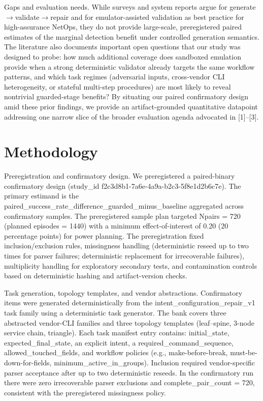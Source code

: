 \documentclass[conference]{IEEEtran}
\begin{document}
Gaps and evaluation needs. While surveys and system reports argue for generate\ensuremath{\rightarrow}validate\ensuremath{\rightarrow}repair and for emulator-assisted validation as best practice for high-assurance NetOps, they do not provide large-scale, preregistered paired estimates of the marginal detection benefit under controlled generation semantics. The literature also documents important open questions that our study was designed to probe: how much additional coverage does sandboxed emulation provide when a strong deterministic validator already targets the same workflow patterns, and which task regimes (adversarial inputs, cross‑vendor CLI heterogeneity, or stateful multi-step procedures) are most likely to reveal nontrivial guarded-stage benefits? By situating our paired confirmatory design amid these prior findings, we provide an artifact-grounded quantitative datapoint addressing one narrow slice of the broader evaluation agenda advocated in [1]--[3].

\section{Methodology}
Preregistration and confirmatory design. We preregistered a paired-binary confirmatory design (study\_id f2c3d8b1-7a6e-4a9a-b2c3-5f8e1d2b6c7e). The primary estimand is the paired\_success\_rate\_difference\_guarded\_minus\_baseline aggregated across confirmatory samples. The preregistered sample plan targeted Npairs = 720 (planned episodes = 1440) with a minimum effect-of-interest of 0.20 (20 percentage points) for power planning. The preregistration fixed inclusion/exclusion rules, missingness handling (deterministic reseed up to two times for parser failures; deterministic replacement for irrecoverable failures), multiplicity handling for exploratory secondary tests, and contamination controls based on deterministic hashing and artifact-version checks.

Task generation, topology templates, and vendor abstractions. Confirmatory items were generated deterministically from the intent\_configuration\_repair\_v1 task family using a deterministic task generator. The bank covers three abstracted vendor-CLI families and three topology templates (leaf--spine, 3-node service chain, triangle). Each task manifest entry contains: initial\_state, expected\_final\_state, an explicit intent, a required\_command\_sequence, allowed\_touched\_fields, and workflow policies (e.g., make-before-break, must-be-down-for-fields, minimum\_active\_in\_groups). Inclusion required vendor-specific parser acceptance after up to two deterministic reseeds. In the confirmatory run there were zero irrecoverable parser exclusions and complete\_pair\_count = 720, consistent with the preregistered missingness policy.
\end{document}
